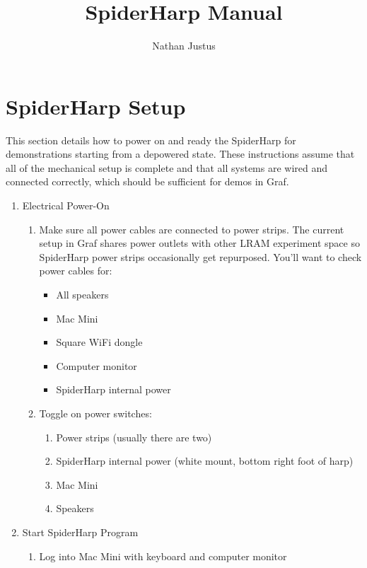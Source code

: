 \documentclass{ol-softwaremanual}
\title{SpiderHarp Manual}
\author{Nathan Justus}
\begin{document}
\maketitle

\tableofcontents
\newpage

\section{SpiderHarp Setup}

This section details how to power on and ready the SpiderHarp for demonstrations starting from a depowered state.  These instructions assume that all of the mechanical setup is complete and that all systems are wired and connected correctly, which should be sufficient for demos in Graf.

\begin{enumerate}
    \item Electrical Power-On
    \begin{enumerate}
        \item Make sure all power cables are connected to power strips.  The current setup in Graf shares power outlets with other LRAM experiment space so SpiderHarp power strips occasionally get repurposed. You'll want to check power cables for:
        \begin{itemize}
            \item All speakers
            \item Mac Mini
            \item Square WiFi dongle
            \item Computer monitor
            \item SpiderHarp internal power
        \end{itemize}
        \item Toggle on power switches:
        \begin{enumerate}
            \item Power strips (usually there are two)
            \item SpiderHarp internal power (white mount, bottom right foot of harp)
            \item Mac Mini
            \item Speakers 
        \end{enumerate}
    \end{enumerate}
    \item Start SpiderHarp Program
    \begin{enumerate}
        \item Log into Mac Mini with keyboard and computer monitor

\end{enumerate}
\end{enumerate}
\end{document}
